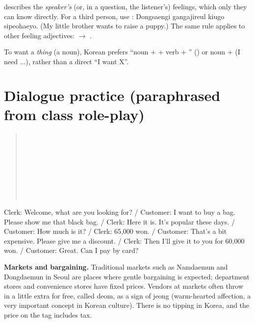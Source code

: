 \begin{important}
 describes the \emph{speaker's} (or, in a question, the listener's)
feelings, which only they can know directly. For a third person, use
:  Dongsaengi gangajireul kiugo
sipeohaeyo. (My little brother wants to raise a puppy.) The same rule applies to other
feeling adjectives:  $\to$ .
\end{important}

To want a \emph{thing} (a noun), Korean prefers ``noun +  + verb + ''
() or noun +  (I need ...), rather than a direct
``I want X''.

\section{Dialogue practice (paraphrased from class role-play)}

\begin{quote}
\\
\\
\\
\\
\\
\\
\\
\end{quote}

\noindent Clerk: Welcome, what are you looking for? / Customer: I want to buy a bag.
Please show me that black bag. / Clerk: Here it is. It's popular these days. / Customer:
How much is it? / Clerk: 65,000 won. / Customer: That's a bit expensive. Please give me a
discount. / Clerk: Then I'll give it to you for 60,000 won. / Customer: Great. Can I pay
by card?

\begin{aside}
\textbf{Markets and bargaining.} Traditional markets such as Namdaemun and Dongdaemun in
Seoul are places where gentle bargaining is expected; department stores and convenience
stores have fixed prices. Vendors at markets often throw in a little extra for free,
called  deom, as a sign of  jeong (warm-hearted affection, a very important
concept in Korean culture). There is no tipping in Korea, and the price on the tag
includes tax.
\end{aside}

